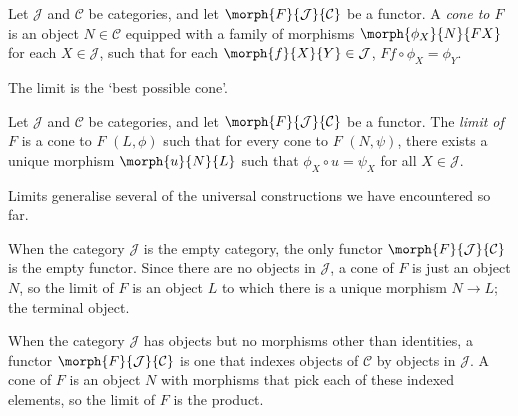 \begin{definition}[Cone]
    Let \(\mathcal{J}\) and \(\mathcal{C}\) be categories, and let
    \(\morph{F}{\mathcal{J}}{\mathcal{C}}\) be a functor.
    A \emph{cone to \(F\)} is an object \(N \in \mathcal{C}\) equipped with
    a family of morphisms \(\morph{\phi_X}{N}{FX}\) for each
    \(X \in \mathcal{J}\), such that for each
    \(\morph{f}{X}{Y} \in \mathcal{J}\),
    \(Ff \circ \phi_X = \phi_Y\).
    \begin{center}
        
    \end{center}
\end{definition}

The limit is the `best possible cone'.

\begin{definition}[Limit]
    Let \(\mathcal{J}\) and \(\mathcal{C}\) be categories, and let
    \(\morph{F}{\mathcal{J}}{\mathcal{C}}\) be a functor.
    The \emph{limit of \(F\)} is a cone to \(F\) \((L,\phi) \) such that for
    every cone to \(F\) \((N, \psi)\), there exists a unique morphism
    \(\morph{u}{N}{L}\) such that \(\phi_X \circ u = \psi_X\) for all
    \(X \in \mathcal{J}\).
    \begin{center}
        
    \end{center}
\end{definition}

Limits generalise several of the universal constructions we have encountered so
far.

\begin{example}\label{ex:terminal-limit}
    When the category \(\mathcal{J}\) is the empty category, the only functor
    \(\morph{F}{\mathcal{J}}{\mathcal{C}}\) is the empty functor.
    Since there are no objects in \(\mathcal{J}\), a cone of \(F\) is just an
    object \(N\), so the limit of \(F\) is an object \(L\) to which there is a
    unique morphism \(N \to L\); the terminal object.

\end{example}

\begin{example}[Products]\label{ex:product-limit}
    When the category \(\mathcal{J}\) has objects but no morphisms other than
    identities, a functor \(\morph{F}{\mathcal{J}}{\mathcal{C}}\) is one that
    indexes objects of \(\mathcal{C}\) by objects in \(\mathcal{J}\).
    A cone of \(F\) is an object \(N\) with morphisms that pick each of these
    indexed elements, so the limit of \(F\) is the product.
\end{example}

